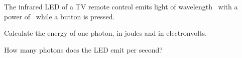 The infrared LED of a TV remote control emits light of wavelength \liO\ with a power of \PeO\ while a button is pressed.

\begin{abcliste}
\abc Calculate the energy of one photon, in joules and in electronvolts.

\abc How many photons does the LED emit per second?
\end{abcliste}
